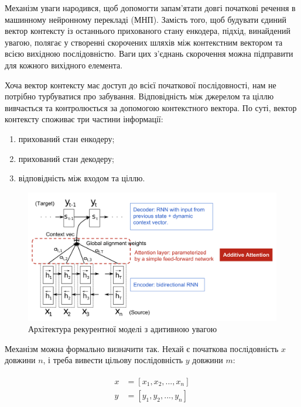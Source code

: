 \documentclass[a4paper,14pt]{extreport}
\begin{document}
Механізм уваги народився, щоб допомогти запам’ятати довгі початкові
речення в машинному нейронному перекладі (МНП). Замість того,
щоб будувати єдиний вектор контексту із останнього прихованого стану
енкодера, підхід, винайдений увагою, полягає у створенні
скорочених шляхів між контекстним вектором та
всією вихідною послідовністю. Ваги цих з'єднань скорочення
можна підправити для кожного вихідного елемента.

Хоча вектор контексту має доступ до всієї початкової послідовності,
нам не потрібно турбуватися про забування.
Відповідність між джерелом та ціллю вивчається та контролюється
за допомогою контекстного вектора. По суті, вектор контексту
споживає три частини інформації:

\begin{enumerate}[label=--]
    \item прихований стан енкодеру;
    \item прихований стан декодеру;
    \item відповідність між входом та ціллю.
\end{enumerate}

\begin{figure}[H]
    \centering
    \includegraphics[width=1\textwidth]{encoder-decoder-attention.png}
    \caption{Архітектура рекурентної моделі з адитивною увагою}
    \label{fig:plot3}
\end{figure}

Механізм можна формально визначити так. Нехай є початкова послідовність
$x$ довжини $n$, і треба вивести цільову послідовність $y$
довжини $m$:

\begin{gather}
\begin{aligned}
    x &= [x_1,x_2, ..., x_n] \\
    y &= [y_1,y_2, ..., y_n]
\end{aligned}
\end{gather}
\end{document}
